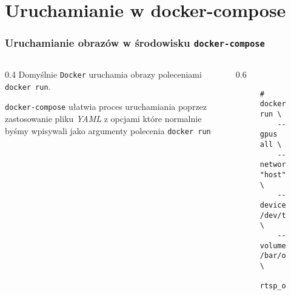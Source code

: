 \documentclass[aspectratio=169]{beamer}
\begin{document}
\section{Uruchamianie w docker-compose}
\begin{frame}[fragile]
    \frametitle{Uruchamianie obrazów w środowisku \texttt{docker-compose}}
    \begin{columns}
        \begin{column}{0.4\textwidth}
            Domyślnie \texttt{Docker} uruchamia obrazy poleceniami \texttt{docker~run}.
    \pause

            \vspace{5mm}

            \texttt{docker-compose} ułatwia proces uruchamiania poprzez zastosowanie pliku \emph{YAML} z opcjami które normalnie byśmy wpisywali jako argumenty polecenia \texttt{docker~run}
        \end{column}
        \begin{column}{0.6\textwidth}
    \pause[0]
            \begin{figure}[H]
                \begin{lstlisting}[frame=single,basicstyle=\scriptsize\ttfamily,morekeywords={docker}]
# docker run \
    --gpus all \
    --network "host" \
    --device /dev/ttyUSB0:/dev/tty2 \
    --volume /bar/off/foo:/bar \
    rtsp_over_serial:latest
    \end{lstlisting}
            \end{figure}
        \end{column}
    \end{columns}
\end{frame}
\end{document}
